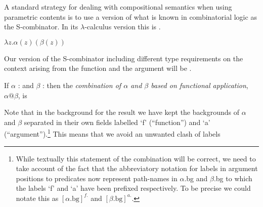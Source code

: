 A standard strategy for dealing with compositional semantics when
using parametric contents is to use a version of what is known in
combinatorial logic as the S-combinator.  In its $\lambda$-calculus
version this is \nexteg{}.
\begin{ex} 
$\lambda z. \alpha(z)(\beta(z))$ 
\end{ex} 
Our version of the S-combinator including different type requirements
on the context arising from the function and the argument will be
\nexteg{}.
\begin{ex}
If $\alpha$ :  
and $\beta$ : 
                         then the \textit{combination of $\alpha$ and
    $\beta$  based on functional application}, $\alpha\text{@}\beta$, is
\begin{quote}
\end{quote}
\end{ex} 
Note that in the background for the result we have kept the
backgrounds of $\alpha$ and $\beta$
separated in their own fields labelled `f' (``function'') and `a'
(``argument'').\footnote{While textually this statement of the combination
  will be correct, we need to take account of the fact that the
  abbreviatory notation for labels in argument positions to predicates
  now represent path-names in $\alpha$.bg and $\beta$.bg to which the labels `f'
  and `a' have been prefixed respectively.  To be precise we could
  notate this as $[\alpha.\text{bg}]^{f.}$ and $[\beta.\text{bg}]^{a.}$.}  This means that we avoid an unwanted clash of labels
